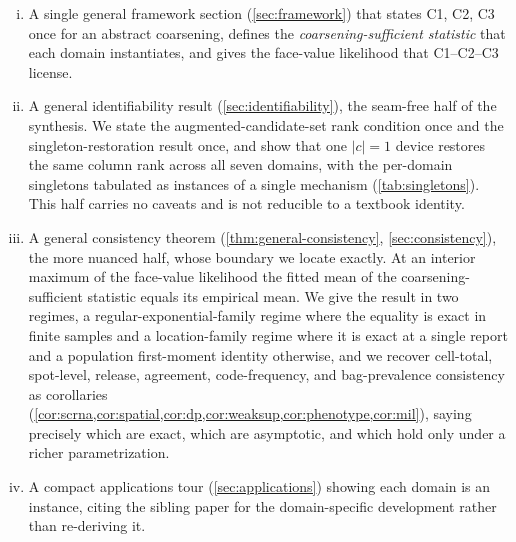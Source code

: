 \begin{enumerate}[(i)]
\item A single general framework section (\cref{sec:framework}) that
  states C1, C2, C3 once for an abstract coarsening, defines the
  \emph{coarsening-sufficient statistic} that each domain instantiates,
  and gives the face-value likelihood that C1--C2--C3 license.
\item A general identifiability result (\cref{sec:identifiability}),
  the seam-free half of the synthesis. We state the
  augmented-candidate-set rank condition once and the
  singleton-restoration result once, and show that one $|c| = 1$ device
  restores the same column rank across all seven domains, with the
  per-domain singletons tabulated as instances of a single mechanism
  (\cref{tab:singletons}). This half carries no caveats and is not
  reducible to a textbook identity.
\item A general consistency theorem (\cref{thm:general-consistency},
  \cref{sec:consistency}), the more nuanced half, whose boundary we
  locate exactly. At an interior maximum of the face-value likelihood
  the fitted mean of the coarsening-sufficient statistic equals its
  empirical mean. We give the result in two regimes, a
  regular-exponential-family regime where the equality is exact in
  finite samples and a location-family regime where it is exact at a
  single report and a population first-moment identity otherwise, and
  we recover cell-total, spot-level, release, agreement,
  code-frequency, and bag-prevalence consistency as corollaries
  (\cref{cor:scrna,cor:spatial,cor:dp,cor:weaksup,cor:phenotype,cor:mil}),
  saying precisely which are exact, which are asymptotic, and which hold
  only under a richer parametrization.
\item A compact applications tour (\cref{sec:applications}) showing
  each domain is an instance, citing the sibling paper for the
  domain-specific development rather than re-deriving it.
\end{enumerate}

